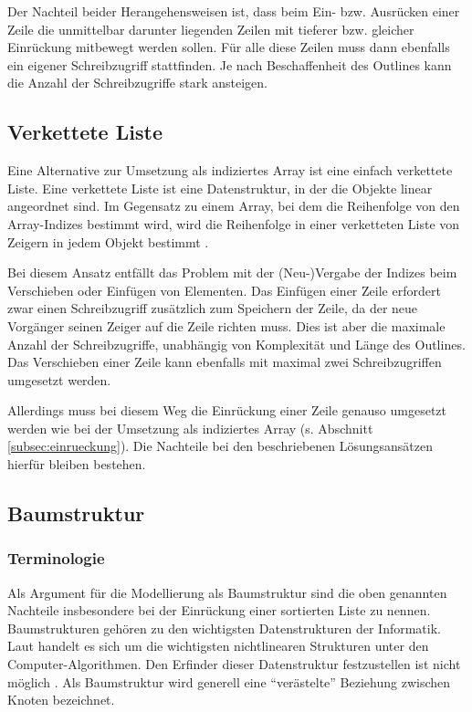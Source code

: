 Der Nachteil beider Herangehensweisen ist, dass beim Ein- bzw. Ausrücken einer Zeile die unmittelbar darunter liegenden Zeilen mit tieferer bzw. gleicher Einrückung mitbewegt werden sollen. Für alle diese Zeilen muss dann ebenfalls ein eigener Schreibzugriff stattfinden. Je nach Beschaffenheit des Outlines kann die Anzahl der Schreibzugriffe stark ansteigen.


\subsection{Verkettete Liste}

Eine Alternative zur Umsetzung als indiziertes Array ist eine einfach verkettete Liste. Eine verkettete Liste ist eine Datenstruktur, in der die Objekte linear angeordnet sind. Im Gegensatz zu einem Array, bei dem die Reihenfolge von den Array-Indizes bestimmt wird, wird die Reihenfolge in einer verketteten Liste von Zeigern in jedem Objekt bestimmt . 

Bei diesem Ansatz entfällt das Problem mit der (Neu-)Vergabe der Indizes beim Verschieben oder Einfügen von Elementen. Das Einfügen einer Zeile erfordert zwar einen Schreibzugriff zusätzlich zum Speichern der Zeile, da der neue Vorgänger seinen Zeiger auf die Zeile richten muss. Dies ist aber die maximale Anzahl der Schreibzugriffe, unabhängig von Komplexität und Länge des Outlines. Das Verschieben einer Zeile kann ebenfalls mit maximal zwei Schreibzugriffen umgesetzt werden. 

Allerdings muss bei diesem Weg die Einrückung einer Zeile genauso umgesetzt werden wie bei der Umsetzung als indiziertes Array (s. Abschnitt \ref{subsec:einrueckung}). Die Nachteile bei den beschriebenen Lösungsansätzen hierfür bleiben bestehen.


\subsection{Baumstruktur}

\subsubsection{Terminologie}

Als Argument für die Modellierung als Baumstruktur sind die oben genannten Nachteile insbesondere bei der Einrückung einer sortierten Liste zu nennen. Baumstrukturen gehören zu den wichtigsten Datenstrukturen der Informatik. 
Laut  handelt es sich um die wichtigsten nichtlinearen Strukturen unter den Computer-Algorithmen. Den Erfinder dieser Datenstruktur festzustellen ist nicht möglich . Als Baumstruktur wird generell eine \enquote{verästelte} Beziehung zwischen Knoten bezeichnet. 

